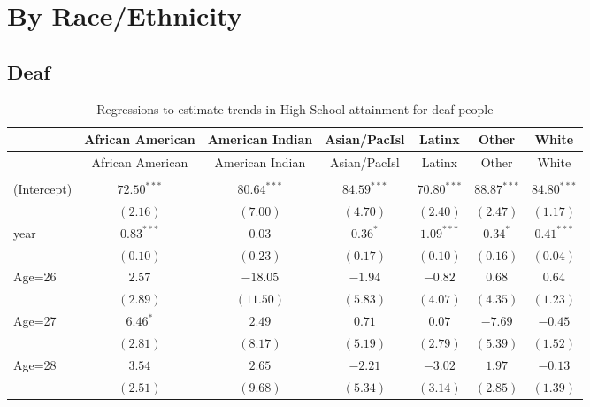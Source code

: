 \documentclass[fullpage]{paper}
\begin{document}
\section{ By Race/Ethnicity }

\subsection{ Deaf }

\begin{center}
\begin{longtable}{l c c c c c c }
\hline
 & African American & American Indian & Asian/PacIsl & Latinx & Other & White \\
\hline
\endfirsthead
\hline
 & African American & American Indian & Asian/PacIsl & Latinx & Other & White \\
\hline
\endhead
\hline
\endfoot
\hline
\multicolumn{7}{l}{\scriptsize{$^{***}p<0.001$, $^{**}p<0.01$, $^*p<0.05$}}\\
\caption{Regressions to estimate trends in High School attainment for deaf people}
\label{table:coefficients}
\endlastfoot
(Intercept) & $72.50^{***}$ & $80.64^{***}$ & $84.59^{***}$  & $70.80^{***}$  & $88.87^{***}$  & $84.80^{***}$ \\
            & $(2.16)$      & $(7.00)$      & $(4.70)$       & $(2.40)$       & $(2.47)$       & $(1.17)$      \\
year        & $0.83^{***}$  & $0.03$        & $0.36^{*}$     & $1.09^{***}$   & $0.34^{*}$     & $0.41^{***}$  \\
            & $(0.10)$      & $(0.23)$      & $(0.17)$       & $(0.10)$       & $(0.16)$       & $(0.04)$      \\
Age=26      & $2.57$        & $-18.05$      & $-1.94$        & $-0.82$        & $0.68$         & $0.64$        \\
            & $(2.89)$      & $(11.50)$     & $(5.83)$       & $(4.07)$       & $(4.35)$       & $(1.23)$      \\
Age=27      & $6.46^{*}$    & $2.49$        & $0.71$         & $0.07$         & $-7.69$        & $-0.45$       \\
            & $(2.81)$      & $(8.17)$      & $(5.19)$       & $(2.79)$       & $(5.39)$       & $(1.52)$      \\
Age=28      & $3.54$        & $2.65$        & $-2.21$        & $-3.02$        & $1.97$         & $-0.13$       \\
            & $(2.51)$      & $(9.68)$      & $(5.34)$       & $(3.14)$       & $(2.85)$       & $(1.39)$      \\

\end{longtable}
\end{center}
\end{document}
